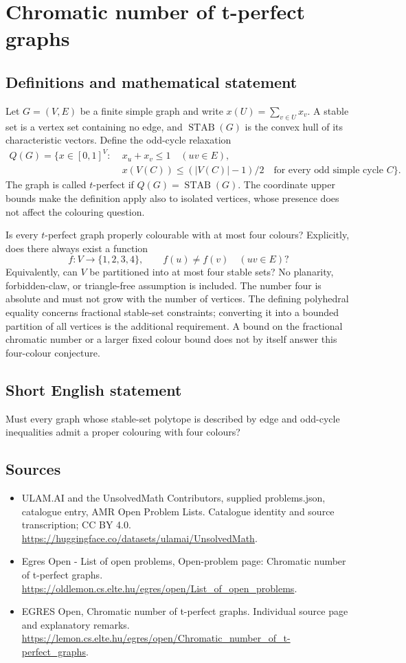 \documentclass[11pt,a4paper]{article}
\begin{document}
\section*{Chromatic number of t-perfect graphs}\label{statement}

\subsection{Definitions and mathematical statement}
Let $G=(V,E)$ be a finite simple graph and write $x(U)=\sum_{v\in U}x_v$.
A stable set is a vertex set containing no edge, and
$\operatorname{STAB}(G)$ is the convex hull of its characteristic vectors.
Define the odd-cycle relaxation
\[
\begin{split}
 Q(G)=\{x\in[0,1]^V:\;&x_u+x_v\le1\quad(uv\in E),\\
 &x(V(C))\le (|V(C)|-1)/2\quad\text{for every odd simple cycle }C\}.
\end{split}
\]
The graph is called $t$-perfect if $Q(G)=\operatorname{STAB}(G)$.
The coordinate upper bounds make the definition apply also to isolated
vertices, whose presence does not affect the colouring question.

Is every $t$-perfect graph properly colourable with at most four colours?
Explicitly, does there always exist a function
\[
                  f:V\longrightarrow\{1,2,3,4\},\qquad
                  f(u)\ne f(v)\quad(uv\in E)?
\]
Equivalently, can $V$ be partitioned into at most four stable sets?
No planarity, forbidden-claw, or triangle-free assumption is included.
The number four is absolute and must not grow with the number of vertices.
The defining polyhedral equality concerns fractional stable-set constraints;
converting it into a bounded partition of all vertices is the additional
requirement. A bound on the fractional chromatic number or a larger fixed
colour bound does not by itself answer this four-colour conjecture.
\subsection{Short English statement}
Must every graph whose stable-set polytope is described by edge
and odd-cycle inequalities admit a proper colouring with four colours?
\subsection{Sources}
\begin{itemize}
\item[S1] ULAM.AI and the UnsolvedMath Contributors, supplied problems.json, catalogue entry, AMR Open Problem Lists. Catalogue identity and source transcription; CC BY 4.0.
\url{https://huggingface.co/datasets/ulamai/UnsolvedMath}.
\item[S2] Egres Open - List of open problems, Open-problem page: Chromatic number of t-perfect graphs. 
\url{https://oldlemon.cs.elte.hu/egres/open/List_of_open_problems}.
\item[S3] EGRES Open, Chromatic number of t-perfect graphs. Individual source page and explanatory remarks.
\url{https://lemon.cs.elte.hu/egres/open/Chromatic_number_of_t-perfect_graphs}.
\end{itemize}
\end{document}
